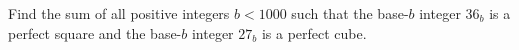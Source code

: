 Find the sum of all positive integers $b<1000$ such that the base-$b$ integer $36_b$ is a perfect square and the base-$b$ integer $27_b$ is a perfect cube.